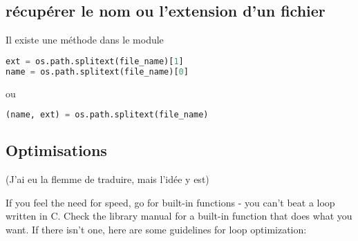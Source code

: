 \documentclass[a4paper,twoside]{article}
\begin{document}
\subsection{récupérer le nom ou l'extension d'un fichier}
Il existe une méthode dans le module 
\begin{lstlisting}[language=python]
ext = os.path.splitext(file_name)[1]
name = os.path.splitext(file_name)[0]
\end{lstlisting}
ou 
\begin{lstlisting}[language=python]
(name, ext) = os.path.splitext(file_name)
\end{lstlisting}



\subsection{Optimisations}
(J'ai eu la flemme de traduire, mais l'idée y est)

If you feel the need for speed, go for built-in functions - you can't beat a loop written in C. Check the library manual for a built-in function that does what you want. If there isn't one, here are some guidelines for loop optimization:
\end{document}
